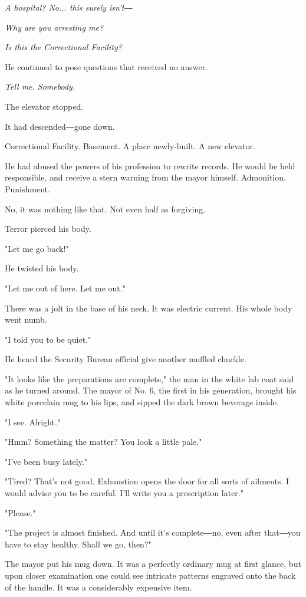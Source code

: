 \emph{A hospital? No... this surely isn't―}

\emph{Why are you arresting me?}

\emph{Is this the Correctional Facility?}

He continued to pose questions that received no answer.

\emph{Tell me. Somebody.}

The elevator stopped.

It had descended―gone down.

Correctional Facility. Basement. A place newly-built. A new elevator.~

He had abused the powers of his profession to rewrite records. He would
be held responsible, and receive a stern warning from the mayor himself.
Admonition. Punishment.

No, it was nothing like that. Not even half as forgiving.

Terror pierced his body.

"Let me go back!"

He twisted his body.

"Let me out of here. Let me out."

There was a jolt in the base of his neck. It was electric current. His
whole body went numb.

"I told you to be quiet."

He heard the Security Bureau official give another muffled chuckle.

\myspace

"It looks like the preparations are complete," the man in the white lab
coat said as he turned around. The mayor of No. 6, the first in his
generation, brought his white porcelain mug to his lips, and sipped the
dark brown beverage inside.

"I see. Alright."

"Hmm? Something the matter? You look a little pale."

"I've been busy lately."

"Tired? That's not good. Exhaustion opens the door for all sorts of
ailments. I would advise you to be careful. I'll write you a
prescription later."

"Please."

"The project is almost finished. And until it's complete―no, even after
that―you have to stay healthy. Shall we go, then?"

The mayor put his mug down. It was a perfectly ordinary mug at first
glance, but upon closer examination one could see intricate patterns
engraved onto the back of the handle. It was a considerably expensive
item.

